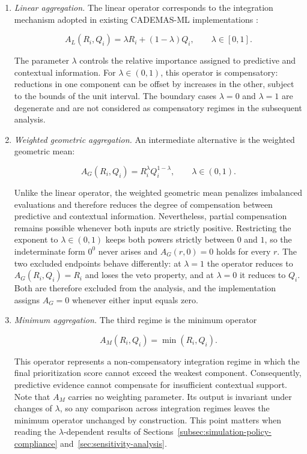 \documentclass[mathematics,article,submit,moreauthors]{Definitions/mdpi}
\begin{document}
\begin{enumerate}

\item \textit{Linear aggregation.}
The linear operator corresponds to the integration mechanism adopted in
existing CADEMAS-ML implementations \citep{Godz2026}:

\begin{equation}
A_L(R_i,Q_i)
=
\lambda R_i + (1-\lambda)Q_i,
\qquad \lambda\in[0,1].
\end{equation}

The parameter $\lambda$ controls the relative importance assigned to
predictive and contextual information.
{\color{red}For \(\lambda\in(0,1)\), this operator is compensatory: reductions in one component can be offset by increases in the other, subject to the bounds of the unit interval. The boundary cases \(\lambda=0\) and \(\lambda=1\) are degenerate and are not considered as compensatory regimes in the subsequent analysis.}

\item \textit{Weighted geometric aggregation.}
{\color{teal}An intermediate alternative is the weighted geometric mean:}

\begin{equation}
A_G(R_i,Q_i)
=
R_i^{\lambda}
Q_i^{1-\lambda},
\qquad \lambda\in(0,1).
\end{equation}

Unlike the linear operator, the weighted geometric mean penalizes
imbalanced evaluations and therefore reduces the degree of compensation
between predictive and contextual information. Nevertheless, partial
compensation remains possible whenever both inputs are strictly
positive.
{\color{teal}Restricting the exponent to \(\lambda\in(0,1)\) keeps both
powers strictly between $0$ and $1$, so the indeterminate form \(0^0\)
never arises and \(A_G(r,0)=0\) holds for every \(r\). The two excluded
endpoints behave differently: at \(\lambda=1\) the operator reduces to
\(A_G(R_i,Q_i)=R_i\) and loses the veto property, and at \(\lambda=0\) it
reduces to \(Q_i\). Both are therefore excluded from the analysis, and the
implementation assigns \(A_G=0\) whenever either input equals zero.}

\item \textit{Minimum aggregation.}
{\color{teal}The third regime is the minimum operator}

\begin{equation}
A_M(R_i,Q_i)
=
\min(R_i,Q_i).
\end{equation}

This operator represents a non-compensatory integration regime in which
the final prioritization score cannot exceed the weakest component.
Consequently, predictive evidence cannot compensate for insufficient
contextual support.
{\color{teal}Note that \(A_M\) carries no weighting parameter. Its output
is invariant under changes of \(\lambda\), so any comparison across
integration regimes leaves the minimum operator unchanged by construction.
This point matters when reading the \(\lambda\)-dependent results of
Sections~\ref{subsec:simulation-policy-compliance}
and~\ref{sec:sensitivity-analysis}.}

\end{enumerate}
\end{document}
